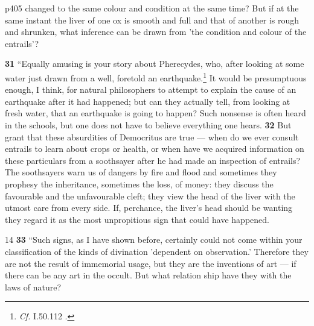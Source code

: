 p405 changed to the same colour and condition at the same time? But if at the same instant the liver of one ox is smooth and full and that of another is rough and shrunken, what inference can be drawn from 'the condition and colour of the entrails'?

\textbf{31} ``Equally amusing is your story about Pherecydes, who, after looking at some water just drawn from a well, foretold an earthquake.\texthebrew{}\footnote{\emph{Cf.}
I.50.112 .

} It would be presumptuous enough, I think, for natural philosophers to attempt to explain the cause of an earthquake after it had happened; but can they actually tell, from looking at fresh water, that an earthquake is going to happen? Such nonsense is often heard in the schools, but one does not have to believe everything one hears. \textbf{32} But grant that these absurdities of Democritus are true \texthebrew{—} when do we ever consult entrails to learn about crops or health, or when have we acquired information on these particulars from a soothsayer after he had made an inspection of entrails? The soothsayers warn us of dangers by fire and flood and sometimes they prophesy the inheritance, sometimes the loss, of money: they discuss the favourable and the unfavourable cleft; they view the head of the liver with the utmost care from every side. If, perchance, the liver's head should be wanting they regard it as the most unpropitious sign that could have happened.

14
\textbf{33} ``Such signs, as I have shown before, certainly could not come within your classification of the kinds of divination 'dependent on observation.' Therefore they are not the result of immemorial usage, but they are the inventions of art \texthebrew{—} if there can be any art in the occult. But what relation ­ship have they with the laws of nature?

